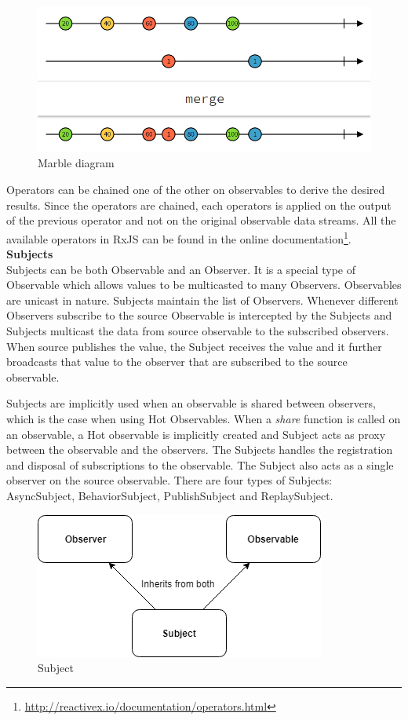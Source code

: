 \begin{figure}[!h]
	\centering
	\includegraphics[scale=0.5,trim=0 0 0 0]{images/operator-marble-diagram.png}
	\caption{Marble diagram}
	\label{fig:operator-marble-diagram}
\end{figure}

Operators can be chained one of the other on observables to derive the desired results. Since the operators are chained, each operators is applied on the output of the previous operator and not on the original observable data streams. All the available operators in RxJS can be found in the online documentation\footnote{\url{http://reactivex.io/documentation/operators.html}}.
\\
\textbf{Subjects}
\\
Subjects can be both Observable and an Observer\cite{reactiveSubjects}. It is a special type of Observable which allows values to be multicasted to many Observers. Observables are unicast in nature. Subjects maintain the list of Observers. Whenever different Observers subscribe to the source Observable is intercepted by the Subjects and Subjects multicast the data from source observable to the subscribed observers. When source publishes the value, the Subject receives the value and it further broadcasts that value to the observer that are subscribed to the source observable. 


Subjects are implicitly used when an observable is shared between observers, which is the case when using Hot Observables. When a \textit{share} function is called on an observable, a Hot observable is implicitly created and Subject acts as proxy between the observable and the observers. The Subjects handles the registration and disposal of subscriptions to the observable. The Subject also acts as a single observer on the source observable. There are four types of Subjects: AsyncSubject, BehaviorSubject, PublishSubject and ReplaySubject.

\begin{figure}[!h]
	\centering
	\includegraphics[scale=0.5,trim=0 0 0 0]{images/subjects.png}
	\caption{Subject}
	\label{fig:subject-diagram}
\end{figure}

